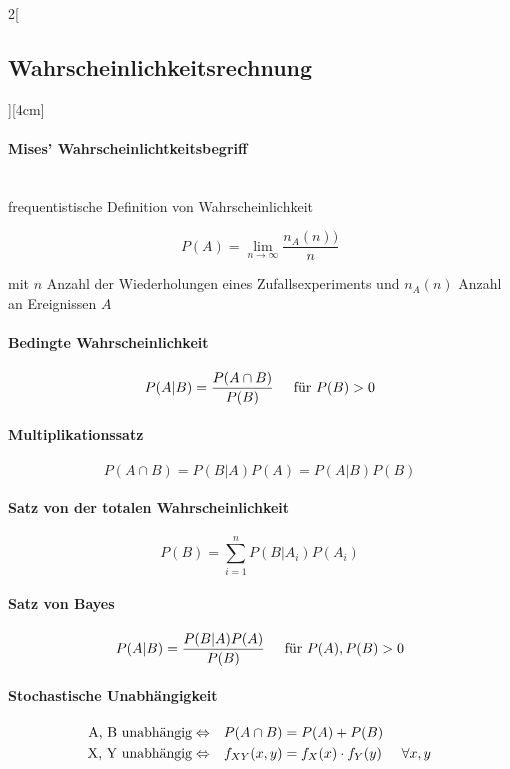 \documentclass[8pt]{extarticle}
\begin{document}
\begin{multicols}{2}[\subsection{Wahrscheinlichkeitsrechnung}][4cm]
\paragraph{Mises' Wahrscheinlichtkeitsbegriff} \ \\

\noindent frequentistische Definition von Wahrscheinlichkeit

$$P(A) = \lim\limits_{n \to \infty}\frac{n_A(n))}{n}$$

mit $n$ Anzahl der Wiederholungen eines Zufallsexperiments und $n_A(n)$ Anzahl an Ereignissen $A$

\paragraph{Bedingte Wahrscheinlichkeit}

$$P(A|B)=\frac{P(A \cap B)}{P(B)} \hspace{0.5cm} \text{für } P(B) > 0$$

\paragraph{Multiplikationssatz}

$$P(A \cap B)=P(B|A)P(A)=P(A|B)P(B)$$

\paragraph{Satz von der totalen Wahrscheinlichkeit}

$$P(B)=\sum\limits_{i=1}^nP(B|A_i)P(A_i)$$

\paragraph{Satz von Bayes}

$$P(A|B)=\frac{P(B|A)P(A)}{P(B)} \hspace{0.5cm} \text{für } P(A), P(B) > 0$$

\paragraph{Stochastische Unabhängigkeit}

\begin{alignat*}{2}
 \text{A, B unabhängig}  \Leftrightarrow  && P(A\cap B) &= P(A)+P(B) \\
 \text{X, Y unabhängig}  \Leftrightarrow && f_{XY}(x,y) &= f_X(x)\cdot f_Y(y) \hspace{0.5cm} \forall x,y
\end{alignat*}

\end{multicols}
\end{document}
